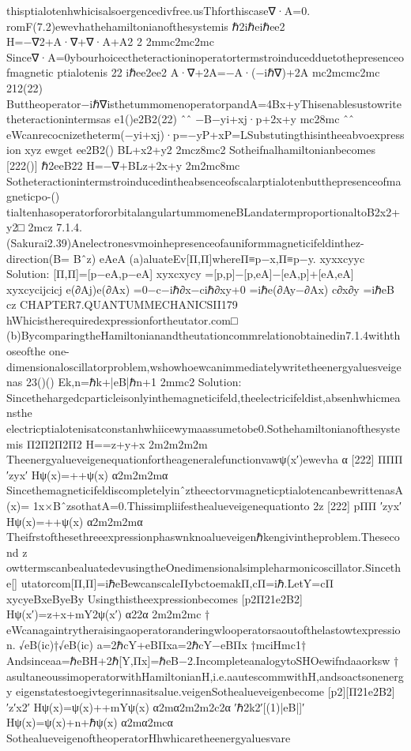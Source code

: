 {{{{{{{{{{thisptialotenhwhicisalsoergencedivfree.usThforthiscase∇·A=0.
romF(7.2)ewevhathehamiltonianofthesystemis
ℏ2iℏeiℏee2
H=−∇2+A·∇+∇·A+A2
2
2mmc2mc2mc
Since∇·A=0ybourhoicectheteractioninoperatortermstroinducedduetothepresenceofmagnetic
ptialotenis
22
iℏee2ee2
A·∇+2A=−A·(−iℏ∇)+2A
mc2mcmc2mc
212(22)
Buttheoperator−iℏ∇isthetummomenoperatorpandA=4Bx+yThisenablesustowrite
theteractionintermsas
e1()e2B2(22)
ˆˆ
−B−yi+xj·p+2x+y
mc28mc
ˆˆ
eWcanrecocnizetheterm(−yi+xj)·p=−yP+xP=LSubstutingthisintheeabvoexpression
xyz
ewget
ee2B2()
BL+x2+y2
2mcz8mc2
Sotheifnalhamiltonianbecomes
[222()]
ℏ2eeB22
H=−∇+BLz+2x+y
2m2mc8mc
Sotheteractionintermstroinducedintheabsenceofscalarptialotenbutthepresenceofmagneticpo-()
tialtenhasoperatorfororbitalangulartummomeneBLandatermproportionaltoB2x2+y2□
2mcz
7.1.4.(Sakurai2.39)Anelectronesvmoinhepresenceofauniformmagneticifeldinthez-direction(B=
Bˆz)
eAeA
(a)aluateEv[Π,Π]whereΠ≡p−x,Π≡p−y.
xyxxcyyc
Solution:
[Π,Π]=[p−eA,p−eA]
xyxcxycy
=[p,p]−[p,eA]−[eA,p]+[eA,eA]
xyxcycijcicj
e(∂Aj)e(∂Ax)
=0−c−iℏ∂x−ciℏ∂xy+0
=iℏe(∂Ay−∂Ax)
c∂x∂y
=iℏeB
cz
CHAPTER7.QUANTUMMECHANICSII179
hWhicistherequiredexpressionfortheutator.com□
(b)BycomparingtheHamiltonianandtheutationcommrelationobtainedin7.1.4withthoseofthe
one-dimensionaloscillatorproblem,wshowhoewcanimmediatelywritetheenergyaluesveigenas
23()()
Ek,n=ℏk+|eB|ℏn+1
2mmc2
Solution:
Sincethehargedcparticleisonlyinthemagneticifeld,theelectricifeldist,absenhwhicmeansthe
electricptialotenisatconstanhwhiicewymaassumetobe0.Sothehamiltonianofthesystemis
Π2Π2Π2Π2
H==z+y+x
2m2m2m2m
Theenergyalueveigenequationfortheageneralefunctionvawψ(x′)ewevha
α
[222]
ΠΠΠ
′zyx′
Hψ(x)=++ψ(x)
α2m2m2mα
SincethemagneticifeldiscompletelyinˆztheectorvmagneticptialotencanbewrittenasA(x)=
1x×BˆzsothatA=0.Thissimpliifesthealueveigenequationto
2z
[222]
pΠΠ
′zyx′
Hψ(x)=++ψ(x)
α2m2m2mα
Theifrstofthesethreeexpressionphaswnknoalueveigenℏkengivintheproblem.Thesecond
z
owttermscanbealuatedevusingtheOnedimensionalsimpleharmonicoscillator.Sincethe[]
utatorcom[Π,Π]=iℏeBewcanscaleΠybctoemakΠ,cΠ=iℏ.LetY=cΠ
xycyeBxeByeBy
Usingthistheexpressionbecomes
[p2Π21e2B2]
Hψ(x′)=z+x+mY2ψ(x′)
α22α
2m2m2mc
†
eWcanagaintrytheraisingaoperatoranderingwlooperatorsaoutofthelastowtexpression.
√eB(ic)†√eB(ic)
a=2ℏcY+eBΠxa=2ℏcY−eBΠx
†mciHmc1†
Andsinceaa=ℏeBH+2ℏ[Y,Πx]=ℏeB−2.IncompleteanalogytoSHOewifndaaorksw
†
asultaneoussimoperatorwithHamiltonianH,i.e.aautescommwithH,andsoactsonenergy
eigenstatestoegivtegerinnasitsalue.veigenSothealueveigenbecome
[p2][Π21e2B2]
′z′x2′
Hψ(x)=ψ(x)++mYψ(x)
α2mα2m2m2c2α
′ℏ2k2′[(1)|eB|]′
Hψ(x)=ψ(x)+n+ℏψ(x)
α2mα2mcα
SothealueveigenoftheoperatorHhwhicaretheenergyaluesvare
}}}}}}}}}}
